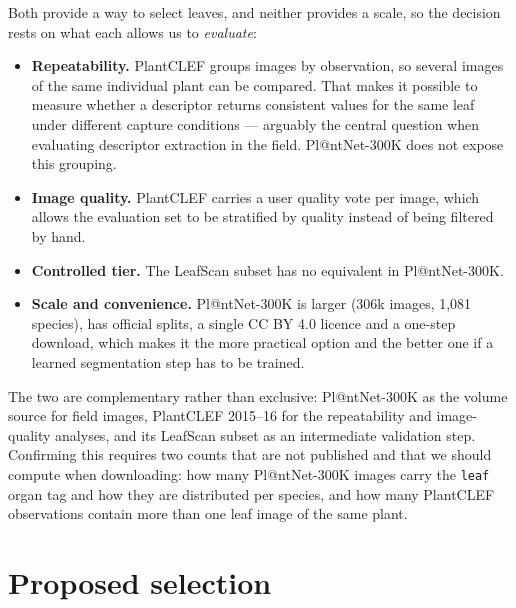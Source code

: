 \documentclass[11pt,a4paper]{article}
\begin{document}
Both provide a way to select leaves, and neither provides a scale, so the
decision rests on what each allows us to \emph{evaluate}:

\begin{itemize}[leftmargin=1.4em,itemsep=0.25em,topsep=0.2em]
  \item \textbf{Repeatability.} PlantCLEF groups images by observation, so
        several images of the same individual plant can be compared. That makes
        it possible to measure whether a descriptor returns consistent values
        for the same leaf under different capture conditions --- arguably the
        central question when evaluating descriptor extraction in the field.
        Pl@ntNet-300K does not expose this grouping.
  \item \textbf{Image quality.} PlantCLEF carries a user quality vote per
        image, which allows the evaluation set to be stratified by quality
        instead of being filtered by hand.
  \item \textbf{Controlled tier.} The LeafScan subset has no equivalent in
        Pl@ntNet-300K.
  \item \textbf{Scale and convenience.} Pl@ntNet-300K is larger (306k images,
        1,081 species), has official splits, a single CC BY 4.0 licence and a
        one-step download, which makes it the more practical option and the
        better one if a learned segmentation step has to be trained.
\end{itemize}

The two are complementary rather than exclusive: Pl@ntNet-300K as the volume
source for field images, PlantCLEF 2015--16 for the repeatability and
image-quality analyses, and its LeafScan subset as an intermediate validation
step. Confirming this requires two counts that are not published and that we
should compute when downloading: how many Pl@ntNet-300K images carry the
\texttt{leaf} organ tag and how they are distributed per species, and how many
PlantCLEF observations contain more than one leaf image of the same plant.

\section*{Proposed selection}
\end{document}
